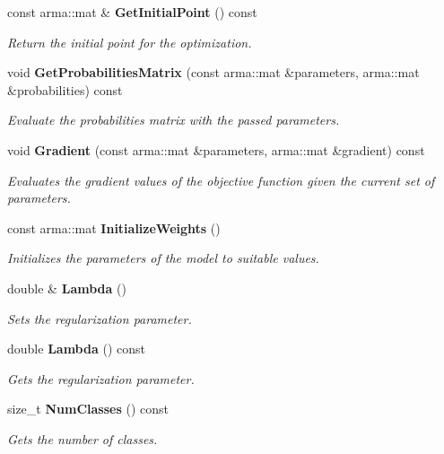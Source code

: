 \begin{DoxyCompactItemize}
const arma\+::mat \& {\bf Get\+Initial\+Point} () const 
\begin{DoxyCompactList}\small\item\em Return the initial point for the optimization. \end{DoxyCompactList}\item 
void {\bf Get\+Probabilities\+Matrix} (const arma\+::mat \&parameters, arma\+::mat \&probabilities) const 
\begin{DoxyCompactList}\small\item\em Evaluate the probabilities matrix with the passed parameters. \end{DoxyCompactList}\item 
void {\bf Gradient} (const arma\+::mat \&parameters, arma\+::mat \&gradient) const 
\begin{DoxyCompactList}\small\item\em Evaluates the gradient values of the objective function given the current set of parameters. \end{DoxyCompactList}\item 
const arma\+::mat {\bf Initialize\+Weights} ()
\begin{DoxyCompactList}\small\item\em Initializes the parameters of the model to suitable values. \end{DoxyCompactList}\item 
double \& {\bf Lambda} ()
\begin{DoxyCompactList}\small\item\em Sets the regularization parameter. \end{DoxyCompactList}\item 
double {\bf Lambda} () const 
\begin{DoxyCompactList}\small\item\em Gets the regularization parameter. \end{DoxyCompactList}\item 
size\+\_\+t {\bf Num\+Classes} () const 
\begin{DoxyCompactList}\small\item\em Gets the number of classes. \end{DoxyCompactList}\end{DoxyCompactItemize}
